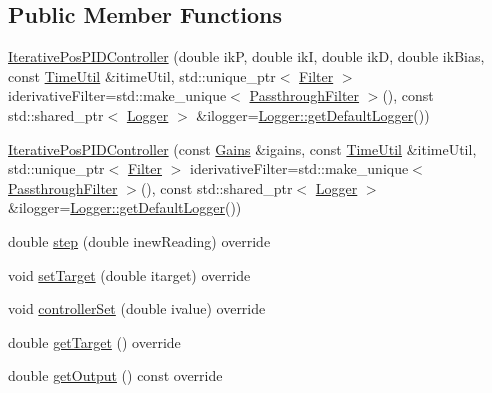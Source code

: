 \subsection*{Public Member Functions}
\begin{DoxyCompactItemize}
\item 
\mbox{\hyperlink{classokapi_1_1IterativePosPIDController_a2478d2d77267e78f3b8c0b1770569f1e}{Iterative\+Pos\+P\+I\+D\+Controller}} (double ikP, double ikI, double ikD, double ik\+Bias, const \mbox{\hyperlink{classokapi_1_1TimeUtil}{Time\+Util}} \&itime\+Util, std\+::unique\+\_\+ptr$<$ \mbox{\hyperlink{classokapi_1_1Filter}{Filter}} $>$ iderivative\+Filter=std\+::make\+\_\+unique$<$ \mbox{\hyperlink{classokapi_1_1PassthroughFilter}{Passthrough\+Filter}} $>$(), const std\+::shared\+\_\+ptr$<$ \mbox{\hyperlink{classokapi_1_1Logger}{Logger}} $>$ \&ilogger=\mbox{\hyperlink{classokapi_1_1Logger_a5053cf778b4b55acba788a3797dc96d2}{Logger\+::get\+Default\+Logger}}())
\item 
\mbox{\hyperlink{classokapi_1_1IterativePosPIDController_a974edf0efdbc9201c529552a7b2d9ebd}{Iterative\+Pos\+P\+I\+D\+Controller}} (const \mbox{\hyperlink{structokapi_1_1IterativePosPIDController_1_1Gains}{Gains}} \&igains, const \mbox{\hyperlink{classokapi_1_1TimeUtil}{Time\+Util}} \&itime\+Util, std\+::unique\+\_\+ptr$<$ \mbox{\hyperlink{classokapi_1_1Filter}{Filter}} $>$ iderivative\+Filter=std\+::make\+\_\+unique$<$ \mbox{\hyperlink{classokapi_1_1PassthroughFilter}{Passthrough\+Filter}} $>$(), const std\+::shared\+\_\+ptr$<$ \mbox{\hyperlink{classokapi_1_1Logger}{Logger}} $>$ \&ilogger=\mbox{\hyperlink{classokapi_1_1Logger_a5053cf778b4b55acba788a3797dc96d2}{Logger\+::get\+Default\+Logger}}())
\item 
double \mbox{\hyperlink{classokapi_1_1IterativePosPIDController_acec6d9ee4c41f78b54b6b28317bcd1e9}{step}} (double inew\+Reading) override
\item 
void \mbox{\hyperlink{classokapi_1_1IterativePosPIDController_a566f7d7834eefd6b542d2e231d6219f9}{set\+Target}} (double itarget) override
\item 
void \mbox{\hyperlink{classokapi_1_1IterativePosPIDController_ab77771ba39d01e5f8d29984fd43abd38}{controller\+Set}} (double ivalue) override
\item 
double \mbox{\hyperlink{classokapi_1_1IterativePosPIDController_a1c4c3a54b616e4250e65a88b0cb12276}{get\+Target}} () override
\item 
double \mbox{\hyperlink{classokapi_1_1IterativePosPIDController_aeb015338c954bf1a7ef0b792ea6c490c}{get\+Output}} () const override

\end{DoxyCompactItemize}
